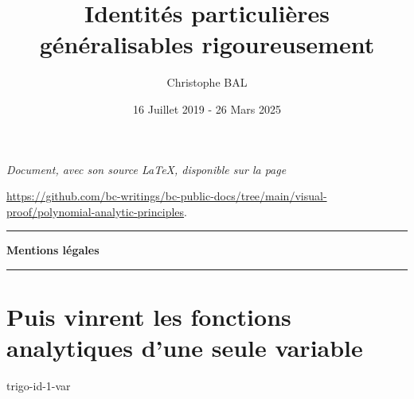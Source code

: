 \documentclass[12pt]{amsart}
\begin{document}
\title{Identités particulières généralisables rigoureusement}
\author{Christophe BAL}
\date{16 Juillet 2019 - 26 Mars 2025}

\maketitle

\begin{center}
	\itshape
	Document, avec son source \LaTeX, disponible sur la page

	\url{https://github.com/bc-writings/bc-public-docs/tree/main/visual-proof/polynomial-analytic-principles}.
\end{center}


\bigskip


\begin{center}
	\hrule\vspace{.3em}
	{
		\fontsize{1.35em}{1em}\selectfont
		\textbf{Mentions \og légales \fg}
	}

	\vspace{0.45em}
	\doclicenseThis
	\hrule
\end{center}


\bigskip


\setcounter{tocdepth}{1}
\tableofcontents



%
%
%
%
%
%
%
%
%
%
\newpage
\section{Puis vinrent les fonctions analytiques d'une seule variable}

{trigo-id-1-var}
%
%
%
%
%
\end{document}
